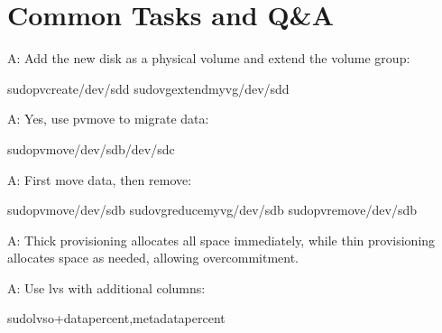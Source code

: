 \documentclass[letterpaper,10pt,english]{sphinxmanual}
\begin{document}
\section{Common Tasks and Q\&A}
\label{\detokenize{volume-management:common-tasks-and-q-a}}
\sphinxAtStartPar
{}

\sphinxAtStartPar
A: Add the new disk as a physical volume and extend the volume group:

\begin{sphinxVerbatim}[commandchars=\\\{\}]
sudopvcreate/dev/sdd
sudovgextendmyvg/dev/sdd
\end{sphinxVerbatim}

\sphinxAtStartPar
{}

\sphinxAtStartPar
A: Yes, use pvmove to migrate data:

\begin{sphinxVerbatim}[commandchars=\\\{\}]
sudopvmove/dev/sdb/dev/sdc
\end{sphinxVerbatim}

\sphinxAtStartPar
{}

\sphinxAtStartPar
A: First move data, then remove:

\begin{sphinxVerbatim}[commandchars=\\\{\}]
sudopvmove/dev/sdb
sudovgreducemyvg/dev/sdb
sudopvremove/dev/sdb
\end{sphinxVerbatim}

\sphinxAtStartPar
{}

\sphinxAtStartPar
A: Thick provisioning allocates all space immediately, while thin provisioning allocates space as needed, allowing overcommitment.

\sphinxAtStartPar
{}

\sphinxAtStartPar
A: Use lvs with additional columns:

\begin{sphinxVerbatim}[commandchars=\\\{\}]
sudolvs\PYGZhy{}o+data\PYGZus{}percent,metadata\PYGZus{}percent
\end{sphinxVerbatim}
\end{document}
